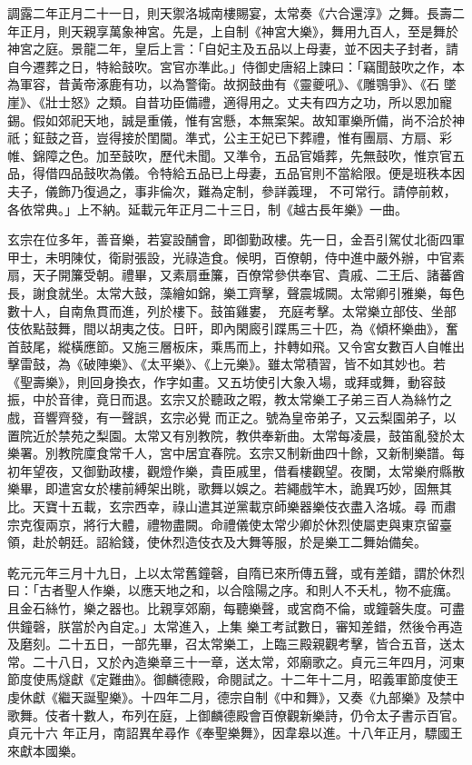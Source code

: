 \begin{pinyinscope}
 調露二年正月二十一日，則天禦洛城南樓賜宴，太常奏《六合還淳》之舞。長壽二年正月，則天親享萬象神宮。先是，上自制《神宮大樂》，舞用九百人，至是舞於神宮之庭。景龍二年，皇后上言：「自妃主及五品以上母妻，並不因夫子封者，請自今遷葬之日，特給鼓吹。宮官亦準此。」侍御史唐紹上諫曰：「竊聞鼓吹之作，本為軍容，昔黃帝涿鹿有功，以為警衛。故㧏鼓曲有《靈夔吼》、《雕鶚爭》、《石
 墜崖》、《壯士怒》之類。自昔功臣備禮，適得用之。丈夫有四方之功，所以恩加寵錫。假如郊祀天地，誠是重儀，惟有宮懸，本無案架。故知軍樂所備，尚不洽於神祇；鉦鼓之音，豈得接於閨閫。準式，公主王妃已下葬禮，惟有團扇、方扇、彩帷、錦障之色。加至鼓吹，歷代未聞。又準令，五品官婚葬，先無鼓吹，惟京官五品，得借四品鼓吹為儀。令特給五品已上母妻，五品官則不當給限。便是班秩本因夫子，儀飾乃復過之，事非倫次，難為定制，參詳義理，
 不可常行。請停前敕，各依常典。」上不納。延載元年正月二十三日，制《越古長年樂》一曲。



 玄宗在位多年，善音樂，若宴設酺會，即御勤政樓。先一日，金吾引駕仗北衙四軍甲士，未明陳仗，衛尉張設，光祿造食。候明，百僚朝，侍中進中嚴外辦，中官素扇，天子開簾受朝。禮畢，又素扇垂簾，百僚常參供奉官、貴戚、二王后、諸蕃酋長，謝食就坐。太常大鼓，藻繪如錦，樂工齊擊，聲震城闕。太常卿引雅樂，每色數十人，自南魚貫而進，列於樓下。鼓笛雞婁，
 充庭考擊。太常樂立部伎、坐部伎依點鼓舞，間以胡夷之伎。日旰，即內閑廄引蹀馬三十匹，為《傾杯樂曲》，奮首鼓尾，縱橫應節。又施三層板床，乘馬而上，抃轉如飛。又令宮女數百人自帷出擊雷鼓，為《破陣樂》、《太平樂》、《上元樂》。雖太常積習，皆不如其妙也。若《聖壽樂》，則回身換衣，作字如畫。又五坊使引大象入場，或拜或舞，動容鼓振，中於音律，竟日而退。玄宗又於聽政之暇，教太常樂工子弟三百人為絲竹之戲，音響齊發，有一聲誤，玄宗必覺
 而正之。號為皇帝弟子，又云梨園弟子，以置院近於禁苑之梨園。太常又有別教院，教供奉新曲。太常每凌晨，鼓笛亂發於太樂署。別教院廩食常千人，宮中居宜春院。玄宗又制新曲四十餘，又新制樂譜。每初年望夜，又御勤政樓，觀燈作樂，貴臣戚里，借看樓觀望。夜闌，太常樂府縣散樂畢，即遣宮女於樓前縛架出眺，歌舞以娛之。若繩戲竿木，詭異巧妙，固無其比。天寶十五載，玄宗西幸，祿山遣其逆黨載京師樂器樂伎衣盡入洛城。尋
 而肅宗克復兩京，將行大體，禮物盡闕。命禮儀使太常少卿於休烈使屬吏與東京留臺領，赴於朝廷。詔給錢，使休烈造伎衣及大舞等服，於是樂工二舞始備矣。



 乾元元年三月十九日，上以太常舊鐘磬，自隋已來所傳五聲，或有差錯，謂於休烈曰：「古者聖人作樂，以應天地之和，以合陰陽之序。和則人不夭札，物不疵癘。且金石絲竹，樂之器也。比親享郊廟，每聽樂聲，或宮商不倫，或鐘磬失度。可盡供鐘磬，朕當於內自定。」太常進入，上集
 樂工考試數日，審知差錯，然後令再造及磨刻。二十五日，一部先畢，召太常樂工，上臨三殿親觀考擊，皆合五音，送太常。二十八日，又於內造樂章三十一章，送太常，郊廟歌之。貞元三年四月，河東節度使馬燧獻《定難曲》。御麟德殿，命閱試之。十二年十二月，昭義軍節度使王虔休獻《繼天誕聖樂》。十四年二月，德宗自制《中和舞》，又奏《九部樂》及禁中歌舞。伎者十數人，布列在庭，上御麟德殿會百僚觀新樂詩，仍令太子書示百官。貞元十六
 年正月，南詔異牟尋作《奉聖樂舞》，因韋皋以進。十八年正月，驃國王來獻本國樂。




\end{pinyinscope}

